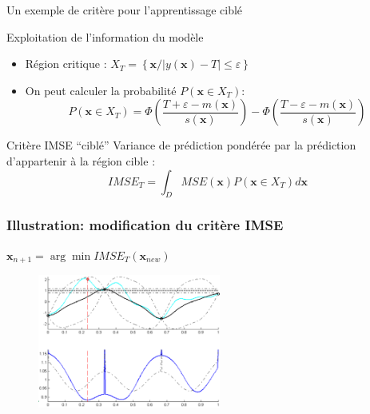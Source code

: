\begin{frame}{Un exemple de critère pour l'apprentissage ciblé}
\begin{block}{Exploitation de l'information du modèle}
\begin{itemize}
	\item Région critique : $X_T = \left\{ \mathbf{x} / \left| y(\mathbf{x}) - T  \right| \leq \varepsilon \right\}$
	\item On peut calculer la probabilité $P\left(\mathbf{x} \in X_T \right)$:
	$$P\left(\mathbf{x} \in X_T \right) = \Phi \left( \frac{T + \varepsilon - m(\mathbf{x})}{s(\mathbf{x})} \right) - \Phi \left( \frac{T - \varepsilon - m(\mathbf{x})}{s(\mathbf{x})} \right)$$
\end{itemize}
\end{block}

\begin{block}{Critère IMSE ``ciblé''}
Variance de prédiction pondérée par la prédiction d'appartenir à la région cible :
$$IMSE_T = \int_D MSE(\mathbf{x}) P\left(\mathbf{x} \in X_T \right)d\mathbf{x}$$
\end{block}
\end{frame}
\frame
{
\frametitle{Illustration: modification du critère IMSE}
$\mathbf{x}_{n+1} = \arg \min IMSE_T(\mathbf{x}_{new})$

\begin{figure}
  \centering
  \includegraphics[width=60mm]{figT/illustIMSETseq.png}
\end{figure}
}
\frame
